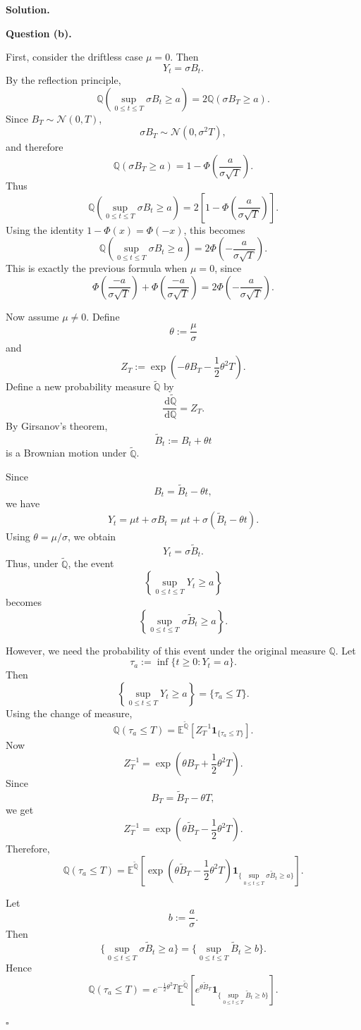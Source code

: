 \documentclass[11pt]{article}
\theoremstyle{plain}
\newcommand{\dd}{\,\mathrm{d}}
\newcommand{\1}{\mathbf{1}}
\theoremstyle{definition}
\newenvironment{solution}
{\par\medskip\noindent\textbf{Solution.}\par\medskip}
{\hfill$\square$\par\medskip}
\newenvironment{solutionpart}[1]
{\par\medskip\noindent\textbf{#1.}\par\smallskip}
{\par\medskip}
\begin{document}
\begin{solution}
\begin{solutionpart}{Question (b)}
First, consider the driftless case $\mu=0$. Then
\[
Y_t=\sigma B_t.
\]
By the reflection principle,
\[
\mathbb{Q}\left(\sup_{0\le t\le T}\sigma B_t\ge a\right)
=
2\mathbb{Q}(\sigma B_T\ge a).
\]
Since $B_T\sim \mathcal N(0,T)$,
\[
\sigma B_T\sim \mathcal N(0,\sigma^2T),
\]
and therefore
\[
\mathbb{Q}(\sigma B_T\ge a)
=
1-\Phi\left(\frac{a}{\sigma\sqrt T}\right).
\]
Thus
\[
\mathbb{Q}\left(\sup_{0\le t\le T}\sigma B_t\ge a\right)
=
2\left[
1-\Phi\left(\frac{a}{\sigma\sqrt T}\right)
\right].
\]
Using the identity $1-\Phi(x)=\Phi(-x)$, this becomes
\[
\mathbb{Q}\left(\sup_{0\le t\le T}\sigma B_t\ge a\right)
=
2\Phi\left(-\frac{a}{\sigma\sqrt T}\right).
\]
This is exactly the previous formula when $\mu=0$, since
\[
\Phi\left(\frac{-a}{\sigma\sqrt T}\right)
+
\Phi\left(\frac{-a}{\sigma\sqrt T}\right)
=
2\Phi\left(-\frac{a}{\sigma\sqrt T}\right).
\]

\medskip

Now assume $\mu\neq 0$. Define
\[
\theta:=\frac{\mu}{\sigma}
\]
and
\[
Z_T:=
\exp\left(
-\theta B_T-\frac12\theta^2T
\right).
\]
Define a new probability measure $\widetilde{\mathbb{Q}}$ by
\[
\frac{\dd\widetilde{\mathbb{Q}}}{\dd\mathbb{Q}}
=
Z_T.
\]
By Girsanov's theorem,
\[
\widetilde B_t:=B_t+\theta t
\]
is a Brownian motion under $\widetilde{\mathbb{Q}}$.

Since
\[
B_t=\widetilde B_t-\theta t,
\]
we have
\[
Y_t
=
\mu t+\sigma B_t
=
\mu t+\sigma(\widetilde B_t-\theta t).
\]
Using $\theta=\mu/\sigma$, we obtain
\[
Y_t=\sigma\widetilde B_t.
\]
Thus, under $\widetilde{\mathbb{Q}}$, the event
\[
\left\{\sup_{0\le t\le T}Y_t\ge a\right\}
\]
becomes
\[
\left\{\sup_{0\le t\le T}\sigma\widetilde B_t\ge a\right\}.
\]

However, we need the probability of this event under the original measure $\mathbb{Q}$.
Let
\[
\tau_a:=\inf\{t\ge0:Y_t=a\}.
\]
Then
\[
\left\{\sup_{0\le t\le T}Y_t\ge a\right\}
=
\{\tau_a\le T\}.
\]
Using the change of measure,
\[
\mathbb{Q}(\tau_a\le T)
=
\mathbb{E}^{\widetilde{\mathbb{Q}}}
\left[
Z_T^{-1}\mathbf 1_{\{\tau_a\le T\}}
\right].
\]
Now
\[
Z_T^{-1}
=
\exp\left(
\theta B_T+\frac12\theta^2T
\right).
\]
Since
\[
B_T=\widetilde B_T-\theta T,
\]
we get
\[
Z_T^{-1}
=
\exp\left(
\theta\widetilde B_T-\frac12\theta^2T
\right).
\]
Therefore,
\[
\mathbb{Q}(\tau_a\le T)
=
\mathbb{E}^{\widetilde{\mathbb{Q}}}
\left[
\exp\left(
\theta\widetilde B_T-\frac12\theta^2T
\right)
\mathbf 1_{\{\sup_{0\le t\le T}\sigma\widetilde B_t\ge a\}}
\right].
\]

Let
\[
b:=\frac{a}{\sigma}.
\]
Then
\[
\{\sup_{0\le t\le T}\sigma\widetilde B_t\ge a\}
=
\{\sup_{0\le t\le T}\widetilde B_t\ge b\}.
\]
Hence
\[
\mathbb{Q}(\tau_a\le T)
=
e^{-\frac12\theta^2T}
\mathbb{E}^{\widetilde{\mathbb{Q}}}
\left[
e^{\theta\widetilde B_T}
\mathbf 1_{\{\sup_{0\le t\le T}\widetilde B_t\ge b\}}
\right].
\]


\end{solutionpart}
\end{solution}
\end{document}
